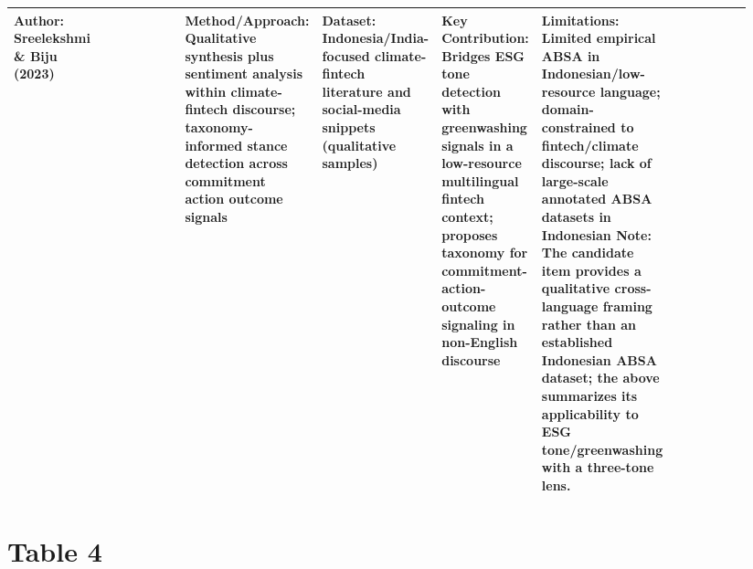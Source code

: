 \documentclass{article}
\begin{document}
\begin{landscape}
\begin{longtable}{p{0.134\linewidth} p{0.134\linewidth} p{0.134\linewidth} p{0.134\linewidth} p{0.134\linewidth} p{0.134\linewidth} p{0.134\linewidth}}
Author: Sreelekshmi \& Biju (2023) & ~ & Method/Approach: Qualitative synthesis plus sentiment analysis within climate-fintech discourse; taxonomy-informed stance detection across commitment action outcome signals & Dataset: Indonesia/India-focused climate-fintech literature and social-media snippets (qualitative samples) & Key Contribution: Bridges ESG tone detection with greenwashing signals in a low-resource multilingual fintech context; proposes taxonomy for commitment-action-outcome signaling in non-English discourse & Limitations: Limited empirical ABSA in Indonesian/low-resource language; domain-constrained to fintech/climate discourse; lack of large-scale annotated ABSA datasets in Indonesian Note: The candidate item provides a qualitative cross-language framing rather than an established Indonesian ABSA dataset; the above summarizes its applicability to ESG tone/greenwashing with a three-tone lens. & ~ \\ \hline

\end{longtable}

\end{landscape}


\section*{Table 4}
\end{document}
